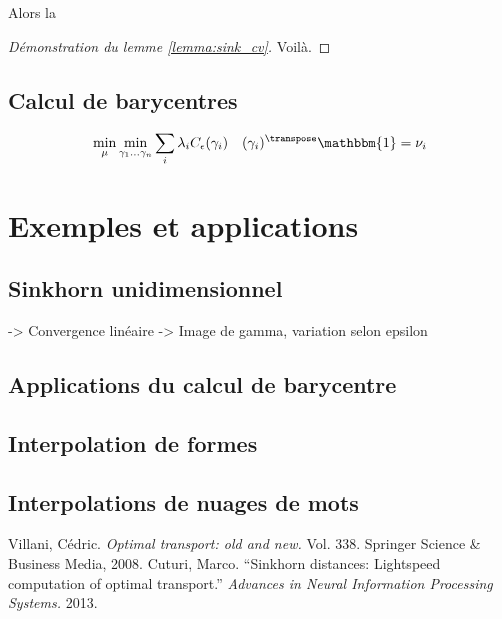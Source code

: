Alors la 

\begin{proof}[Démonstration du lemme \ref{lemma:sink_cv}]
Voilà.
\end{proof}

\subsection{Calcul de barycentres}
\[\min_{\mu} \min_{\gamma_1 \ldots \gamma_n} \sum_i \lambda_i C_\epsilon(\gamma_i) \quad (\gamma_i)^\transpose \mathbbm{1} = \nu_i\]

\section{Exemples et applications}

\subsection{Sinkhorn unidimensionnel}
-> Convergence linéaire
-> Image de gamma, variation selon epsilon

\subsection{Applications du calcul de barycentre}

\subsection{Interpolation de formes}

\subsection{Interpolations de nuages de mots}


\begin{thebibliography}{99}
Villani, Cédric. \textit{Optimal transport: old and new.} Vol. 338. Springer Science \& Business Media, 2008.
Cuturi, Marco. ``Sinkhorn distances: Lightspeed computation of optimal transport.'' \textit{Advances in Neural Information Processing Systems.} 2013.
\end{thebibliography}

